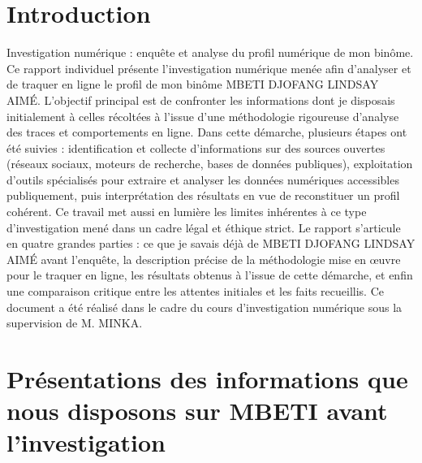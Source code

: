 \documentclass[12pt, a4paper]{article}
\begin{document}
	\newpage
	
	
	\section{\textbf{Introduction}\label{introduction}}
	
	Investigation numérique : enquête et analyse du profil numérique de mon binôme. Ce rapport individuel présente l'investigation numérique menée afin d'analyser et de traquer en ligne le profil de mon binôme MBETI DJOFANG LINDSAY AIMÉ. L'objectif principal est de confronter les informations dont je disposais initialement à celles récoltées à l'issue d'une méthodologie rigoureuse d'analyse des traces et comportements en ligne. Dans cette démarche, plusieurs étapes ont été suivies : identification et collecte d'informations sur des sources ouvertes (réseaux sociaux, moteurs de recherche, bases de données publiques), exploitation d'outils spécialisés pour extraire et analyser les données numériques accessibles publiquement, puis interprétation des résultats en vue de reconstituer un profil cohérent. Ce travail met aussi en lumière les limites inhérentes à ce type d'investigation mené dans un cadre légal et éthique strict. Le rapport s'articule en quatre grandes parties : ce que je savais déjà de MBETI DJOFANG LINDSAY AIMÉ avant l'enquête, la description précise de la méthodologie mise en œuvre pour le traquer en ligne, les résultats obtenus à l'issue de cette démarche, et enfin une comparaison critique entre les attentes initiales et les faits recueillis. Ce document a été réalisé dans le cadre du cours d'investigation numérique sous la supervision de M. MINKA.
	
	\newpage
	
	\section{\textbf{Présentations des informations que nous disposons sur MBETI avant l'investigation}\label{presentation}}
	
\end{document}
